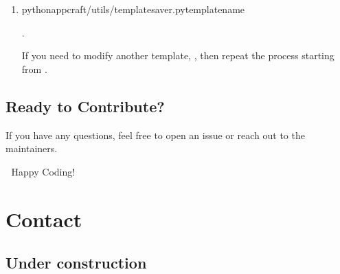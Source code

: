 \documentclass[letterpaper,10pt,english]{sphinxhowto}
\begin{document}
\begin{enumerate}
\begin{description}
\sphinxAtStartPar
Replace  with the template you’re working on and specify any additional dependencies.

\sphinxAtStartPar
{}:

\sphinxAtStartPar
This project mirrors an AppCraft\sphinxhyphen{}initialized project, allowing safe editing.

\end{description}

\item {} \begin{description}
\begin{sphinxVerbatim}[commandchars=\\\{\}]
pythonappcraft/utils/template\PYGZus{}saver.py\PYGZlt{}template\PYGZus{}name\PYGZgt{}
\end{sphinxVerbatim}

\sphinxAtStartPar
{}.

\sphinxAtStartPar
If you need to modify another template, , then repeat the process starting from .

\end{description}

\end{enumerate}


\subsection{Ready to Contribute?}
\label{\detokenize{contributing/index:ready-to-contribute}}
\sphinxAtStartPar
If you have any questions, feel free to open an issue or reach out to the maintainers.

\sphinxAtStartPar
🚀 Happy Coding!

\sphinxstepscope


\section{Contact}
\label{\detokenize{contact:contact}}\label{\detokenize{contact::doc}}

\subsection{Under construction}
\label{\detokenize{contact:under-construction}}
\sphinxstepscope
\end{document}
